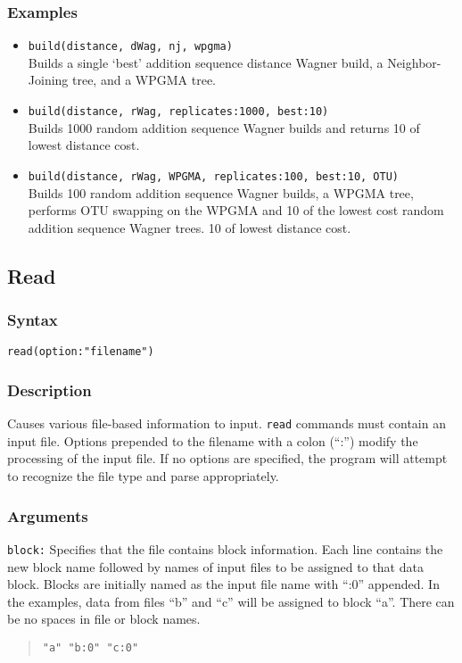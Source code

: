 \documentclass[11pt]{article}
\begin{document}
		\subsubsection{Examples}
			\begin{itemize}
				\item{\texttt{build(distance, dWag, nj, wpgma)}\\Builds a single `best' addition sequence distance Wagner build, a Neighbor-Joining tree, and a WPGMA tree.}
				\item{\texttt{build(distance, rWag, replicates:1000, best:10)}\\Builds 1000 random addition sequence  Wagner builds and returns  
				10 of lowest distance cost.}
				\item{\texttt{build(distance, rWag, WPGMA, replicates:100, best:10, OTU)} \\Builds 100 random addition sequence  Wagner builds, a WPGMA tree, performs OTU swapping on the WPGMA and 10 of the lowest cost random addition sequence Wagner trees. 
			10 of lowest distance cost.}
			\end{itemize}
	\subsection{Read}
		\subsubsection{Syntax}
				\texttt{read(option:"filename")}
			
		\subsubsection{Description}
		Causes various file-based information to input.  \texttt{read} commands must contain an input file.
		Options prepended to the filename with a colon (``:'') modify the processing of the input file. If no options are specified, 
		the program will attempt to recognize the file type and parse appropriately.
		\subsubsection{Arguments}
			\noindent \texttt{block:} Specifies that the file contains block information. Each line contains 
			the new block name followed by names of input files to be assigned to that data block.  
			Blocks are initially named as the input file name with ``:0'' appended.  
			In the examples, data from files ``b'' and ``c'' will be assigned to block ``a''.  There can be no spaces in file or block names.
			\begin{quote}
				\texttt{"a" "b:0" "c:0"}\\
			\end{quote}
		
\end{document}
